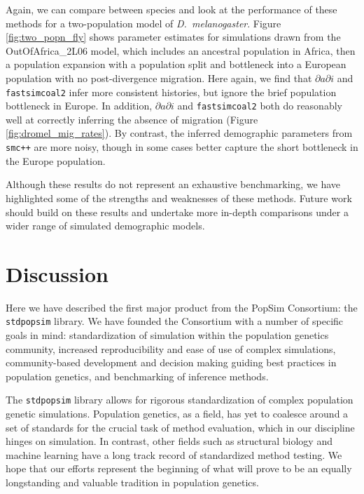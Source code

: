 \documentclass[12pt,halfline,a4paper]{ouparticle}
\newcommand{\stdpopsim}{\texttt{stdpopsim}\xspace}
\newcommand{\dadi}{$\partial a \partial i$\xspace}
\newcommand{\smcpp}{\texttt{smc++}\xspace}
\newcommand{\fastsimcoal}{\texttt{fastsimcoal2}\xspace}
\begin{document}
Again, we can compare between species and look at the performance of these methods 
for a two-population model of \textit{D.~melanogaster}. Figure
\ref{fig:two_popn_fly} shows parameter estimates for simulations drawn from
the OutOfAfrica\_2L06 model, which includes
an ancestral population in Africa, then a population expansion with a population
split and bottleneck into a European population with no post-divergence migration.
Here again, we find that \dadi and \fastsimcoal infer more consistent histories,
but ignore the brief population bottleneck in Europe. In addition, \dadi
and \fastsimcoal both do reasonably well at correctly inferring the absence of
migration (Figure \ref{fig:dromel_mig_rates}). By contrast, the inferred
demographic parameters from \smcpp are more noisy, though in some cases better
capture the short bottleneck in the Europe population.

Although these results do not represent an exhaustive benchmarking,
we have highlighted some of the strengths and weaknesses of these methods.
Future work should build on these results and undertake more in-depth comparisons
under a wider range of simulated demographic models.

\section*{Discussion}

Here we have described the first major product from the PopSim Consortium:
the \stdpopsim library. We have founded the Consortium with a number of specific goals in mind:
standardization of simulation within the population genetics community,
increased reproducibility and ease of use of complex simulations,
community-based development and decision making guiding best practices in population genetics,
and benchmarking of inference methods.

The \stdpopsim library allows for rigorous
standardization of complex population genetic simulations. Population genetics, as a field,
has yet to coalesce around a set of standards for the crucial task of method
evaluation, which in our discipline hinges on simulation. In contrast, other fields such as
structural biology \citep{moult1995large} and machine learning \citep{russakovsky2015imagenet} have a long track record
of standardized method testing. We hope that our efforts represent the beginning of what
will prove to be an equally longstanding and valuable tradition in population genetics.
\end{document}
